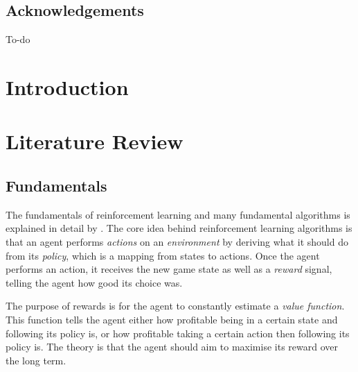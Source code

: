 \documentclass[11pt,a4paper]{article}
\begin{document}
\newpage

\tableofcontents
\listoffigures
\listoftables

\newpage

\begin{center}
   \section*{Acknowledgements}
   To-do



    


    
\end{center}

\newpage


\section{Introduction}

\section{Literature Review}
\subsection{Fundamentals}
The fundamentals of reinforcement learning and many fundamental algorithms is explained in detail by \cite{sutton18}. The core idea behind reinforcement learning algorithms is that an agent performs \emph{actions} on an \emph{environment} by deriving what it should do from its \emph{policy}, which is a mapping from states to actions. Once the agent performs an action, it receives the new game state as well as a \emph{reward} signal, telling the agent how good its choice was.

The purpose of rewards is for the agent to constantly estimate a \emph{value function}. This function tells the agent either how profitable being in a certain state and following its policy is, or how profitable taking a certain action then following its policy is. The theory is that the agent should aim to maximise its reward over the long term.
\end{document}

